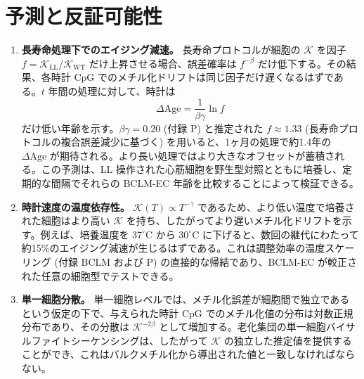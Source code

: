 \documentclass[12pt,a4paper]{ltjsarticle}
\newcommand{\REL}{\mathcal{K}}          %
\begin{document}
	\section{予測と反証可能性}
	\label{sec:predictions}
	
	\begin{enumerate}
		\item \textbf{長寿命処理下でのエイジング減速。}
		長寿命プロトコルが細胞の \(\REL\) を因子 \(f = \REL_{\mathrm{LL}}/\REL_{\mathrm{WT}}\) だけ上昇させる場合、誤差確率は \(f^{-\beta}\) だけ低下する。その結果、各時計 CpG でのメチル化ドリフトは同じ因子だけ遅くなるはずである。\(t\) 年間の処理に対して、時計は
		\[
		\Delta\mathrm{Age} = \frac{1}{\beta\gamma} \ln f
		\]
		だけ低い年齢を示す。\(\beta\gamma = 0.20\) (付録 P) と推定された \(f \approx 1.33\) (長寿命プロトコルの複合誤差減少に基づく) を用いると、1ヶ月の処理で約1.4年の \(\Delta\mathrm{Age}\) が期待される。より長い処理ではより大きなオフセットが蓄積される。この予測は、LL 操作された心筋細胞を野生型対照とともに培養し、定期的な間隔でそれらの BCLM-EC 年齢を比較することによって検証できる。
		
		\item \textbf{時計速度の温度依存性。}
		\(\REL(T) \propto T^{-\gamma}\) であるため、より低い温度で培養された細胞はより高い \(\REL\) を持ち、したがってより遅いメチル化ドリフトを示す。例えば、培養温度を \(37^\circ\text{C}\) から \(30^\circ\text{C}\) に下げると、数回の継代にわたって約15\%のエイジング減速が生じるはずである。これは調整効率の温度スケーリング (付録 BCLM および P) の直接的な帰結であり、BCLM-EC が較正された任意の細胞型でテストできる。
		
		\item \textbf{単一細胞分散。}
		単一細胞レベルでは、メチル化誤差が細胞間で独立であるという仮定の下で、与えられた時計 CpG でのメチル化値の分布は対数正規分布であり、その分散は \(\REL^{-2\beta}\) として増加する。老化集団の単一細胞バイサルファイトシーケンシングは、したがって \(\REL\) の独立した推定値を提供することができ、これはバルクメチル化から導出された値と一致しなければならない。
	\end{enumerate}
	
\end{document}
